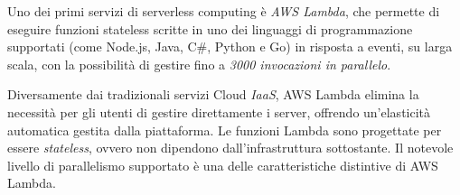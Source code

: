 Uno dei primi servizi di serverless computing è \textit{AWS Lambda}, che permette di eseguire funzioni stateless scritte in uno dei linguaggi di programmazione supportati (come Node.js, Java, C\#, Python e Go) in risposta a eventi, su larga scala, con la possibilità di gestire fino a \textit{3000 invocazioni in parallelo}. 

Diversamente dai tradizionali servizi Cloud \textit{IaaS}, AWS Lambda elimina la necessità per gli utenti di gestire direttamente i server, offrendo un'elasticità automatica gestita dalla piattaforma. Le funzioni Lambda sono progettate per essere \textit{stateless}, ovvero non dipendono dall'infrastruttura sottostante. Il notevole livello di parallelismo supportato è una delle caratteristiche distintive di AWS Lambda.\cite{gimenez2019framework}